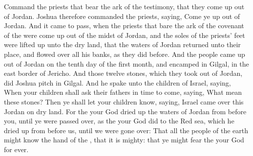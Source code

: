 \begin{biblechapter}
\verse Command the priests that bear the ark of the testimony, that they come up out of Jordan.
\verse Joshua therefore commanded the priests, saying, Come ye up out of Jordan.
\verse And it came to pass, when the priests that bare the ark of the covenant of the \LORD were come up out of the midst of Jordan, and the soles of the priests' feet were lifted up unto the dry land, that the waters of Jordan returned unto their place, and flowed over all his banks, as they did before.
\verse And the people came up out of Jordan on the tenth day of the first month, and encamped in Gilgal, in the east border of Jericho.
\verse And those twelve stones, which they took out of Jordan, did Joshua pitch in Gilgal.
\verse And he spake unto the children of Israel, saying, When your children shall ask their fathers in time to come, saying, What mean these stones?
\verse Then ye shall let your children know, saying, Israel came over this Jordan on dry land.
\verse For the \LORD your God dried up the waters of Jordan from before you, until ye were passed over, as the \LORD your God did to the Red sea, which he dried up from before us, until we were gone over:
\verse That all the people of the earth might know the hand of the \LORD, that it is mighty: that ye might fear the \LORD your God for ever.
\end{biblechapter}

\flushcolsend\columnbreak %

